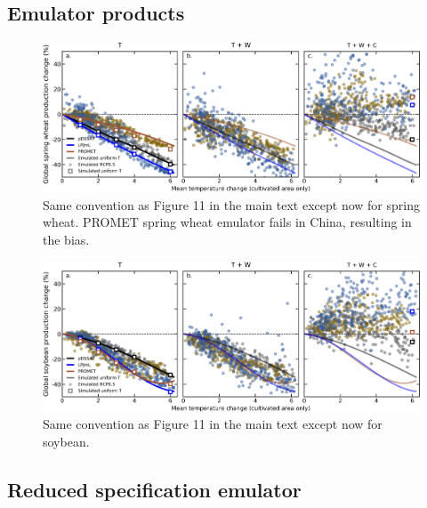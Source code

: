\documentclass[10pt]{article}
\begin{document}
\subsection{Emulator products}
\begin{figure}[h!]
\centering
\includegraphics[width=15.5cm]{LPJmL_pDSSAT_PROMET_RCP85_all_cases_spring_wheat.png}
\caption{Same convention as Figure 11 in the main text except now for spring wheat. PROMET spring wheat emulator fails in China, resulting in the bias.}
\label{fig:spring_wheat_prod}
\end{figure}

\begin{figure}[h!]
\centering
\includegraphics[width=15.5cm]{LPJmL_pDSSAT_PROMET_RCP85_all_cases_soy.png}
\caption{Same convention as Figure 11 in the main text except now for soybean. }
\label{fig:soy_prod}
\end{figure}

\clearpage
\subsection{Reduced specification emulator}
\end{document}
